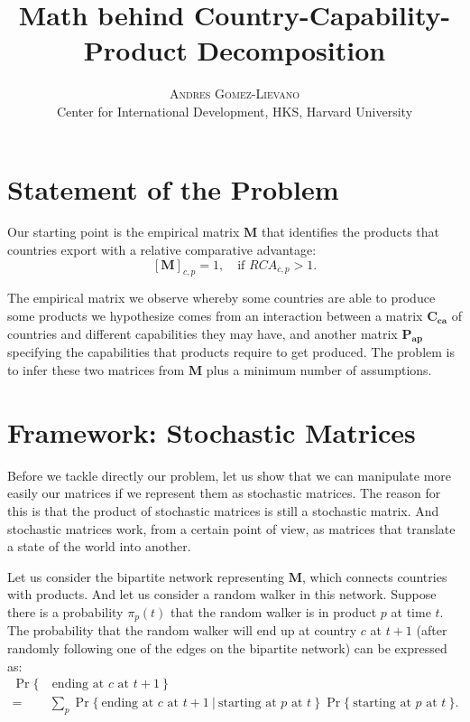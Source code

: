 \documentclass[12pt]{article}
\title{\vspace{-15mm}%
	\fontsize{24pt}{10pt}\selectfont
	\textbf{Math behind Country\--Capability\--Product Decomposition}
	}
\author{%
	\large
	\textsc{Andres Gomez-Lievano} \\[1.5mm]
	\normalsize	Center for International Development, HKS, Harvard University %
	\vspace{-5mm}
	}
\date{}
\newcommand{\mtx}[1]{\mathbf{ #1}}
\begin{document}
\maketitle



\section{Statement of the Problem}
Our starting point is the empirical matrix $\mtx{M}$ that identifies the products that countries export with a relative comparative advantage:
$$
[\mtx{M}]_{c,p}=1,\quad\text{if $RCA_{c,p}>1$}.
$$

The empirical matrix we observe whereby some countries are able to produce some products we hypothesize comes from an interaction between a matrix $\mtx{C_{ca}}$ of countries and different capabilities they may have, and another matrix $\mtx{P_{ap}}$ specifying the capabilities that products require to get produced. The problem is to infer these two matrices from $\mtx{M}$ plus a minimum number of assumptions.

\section{Framework: Stochastic Matrices}
Before we tackle directly our problem, let us show that we can manipulate more easily our matrices if we represent them as stochastic matrices. The reason for this is that the product of stochastic matrices is still a stochastic matrix. And stochastic matrices work, from a certain point of view, as matrices that translate a state of the world into another. 

Let us consider the bipartite network representing $\mtx{M}$, which connects countries with products. And let us consider a random walker in this network. Suppose there is a probability $\pi_p(t)$ that the random walker is in product $p$ at time $t$. The probability that the random walker will end up at country $c$ at $t+1$ (after randomly following one of the edges on the bipartite network) can be expressed as:
\begin{align}
	\Pr\{&~\text{ending at $c$ at $t+1$}~\} \nonumber\\
	=& \sum_{p}\Pr\{~\text{ending at $c$ at $t+1$}~|~\text{starting at $p$ at $t$}~\}~\Pr\{~\text{starting at $p$ at $t$}~\}.\nonumber
\end{align}
\end{document}
